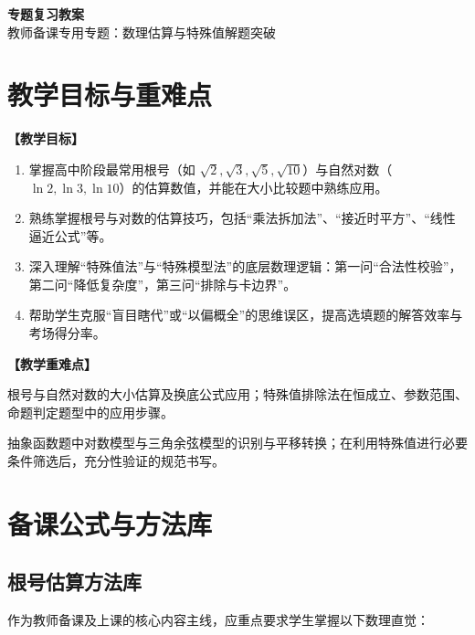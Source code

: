 \documentclass[12pt,a4paper]{ctexart}
\begin{document}
\begin{center}
  {\Large\bfseries 专题复习教案}\\
  \vspace{0.6em}
  {\large 教师备课专用\quad 专题：数理估算与特殊值解题突破}
\end{center}

\section{教学目标与重难点}
\textbf{【教学目标】}
\begin{enumerate}[label=\arabic*. , leftmargin=2em, itemsep=0.1em, topsep=0.2em]
  \item 掌握高中阶段最常用根号（如 \(\sqrt{2},\sqrt{3},\sqrt{5},\sqrt{10}\)）与自然对数（\(\ln 2, \ln 3, \ln 10\)）的估算数值，并能在大小比较题中熟练应用。
  \item 熟练掌握根号与对数的估算技巧，包括“乘法拆加法”、“接近时平方”、“线性逼近公式”等。
  \item 深入理解“特殊值法”与“特殊模型法”的底层数理逻辑：第一问“合法性校验”，第二问“降低复杂度”，第三问“排除与卡边界”。
  \item 帮助学生克服“盲目瞎代”或“以偏概全”的思维误区，提高选填题的解答效率与考场得分率。
\end{enumerate}

\vspace{0.8em}
\textbf{【教学重难点】}
\begin{description}[leftmargin=2em, itemsep=0.1em, topsep=0.2em]
  \item[重点] 根号与自然对数的大小估算及换底公式应用；特殊值排除法在恒成立、参数范围、命题判定题型中的应用步骤。
  \item[难点] 抽象函数题中对数模型与三角余弦模型的识别与平移转换；在利用特殊值进行必要条件筛选后，充分性验证的规范书写。
\end{description}

\newpage

\section{备课公式与方法库}

\subsection{根号估算方法库}
作为教师备课及上课的核心内容主线，应重点要求学生掌握以下数理直觉：
\end{document}

